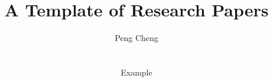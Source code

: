\documentclass{vldb}
\title{A Template of Research Papers}
\author{
\alignauthor Peng Cheng \\
\affaddr{East China Normal University} \\
\affaddr{Shanghai, China} \\
\affaddr{pcheng@sei.ecnu.edu.cn}
\alignauthor Example \\
\affaddr{Example University} \\
\affaddr{Earth, Universe} \\
\affaddr{example@example.edu}
}
\begin{document}
\maketitle























\bgroup\small

\let\xxx=\bibitem\def\bibitem{\par\vspace{1mm}\xxx} %

\egroup
\end{document}
